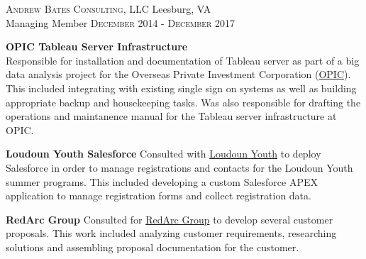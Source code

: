 
\textsc{Andrew Bates Consulting, LLC} \hfill Leesburg, VA\\
Managing Member \hfill \textsc{December 2014} - \textsc{December 2017}

\textbf{OPIC Tableau Server Infrastructure}\\
Responsible for installation and documentation of Tableau server as part of a
big data analysis project for the Overseas Private Investment Corporation (\href{https://www.opic.gov}{OPIC}).  This
included integrating with existing single sign on systems as well as building
appropriate backup and housekeeping tasks.  Was also responsible for drafting
the operations and maintanence manual for the Tableau server infrastructure at
OPIC.

\textbf{Loudoun Youth Salesforce}
Consulted with \href{https://www.loudounyouth.org/}{Loudoun Youth} to deploy Salesforce in order to manage
registrations and contacts for the Loudoun Youth summer programs.  This included
developing a custom Salesforce APEX application to manage registration forms and
collect registration data.

\textbf{RedArc Group}
Consulted for \href{https://redarcgroup.com/}{RedArc Group} to develop several customer proposals.  This work included analyzing customer requirements, researching solutions and assembling proposal documentation for the customer.
